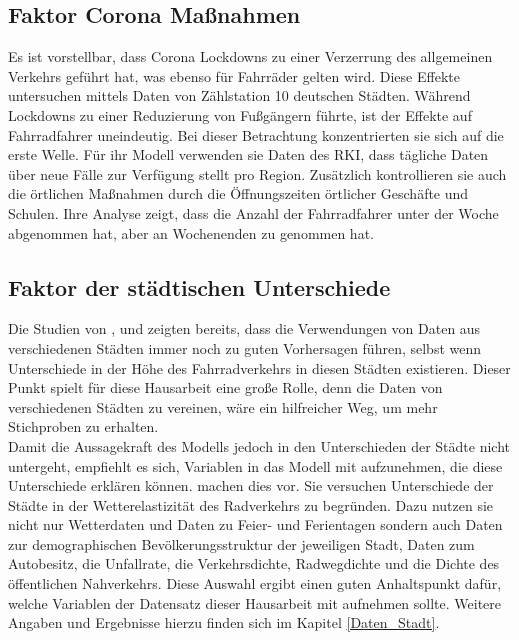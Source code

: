 \documentclass[a4paper,12pt]{thesis}
\begin{document}
\subsection{Faktor Corona Maßnahmen}

Es ist vorstellbar, dass Corona Lockdowns zu einer Verzerrung des allgemeinen Verkehrs geführt hat, was ebenso für Fahrräder gelten wird. Diese Effekte untersuchen \cite{Moellers2021} mittels Daten von Zählstation 10 deutschen Städten. Während Lockdowns zu einer Reduzierung von Fußgängern führte, ist der Effekte auf Fahrradfahrer uneindeutig. Bei dieser Betrachtung konzentrierten sie sich auf die erste Welle. Für ihr Modell verwenden sie Daten des RKI, dass tägliche Daten über neue Fälle zur Verfügung stellt pro Region. Zusätzlich kontrollieren sie auch die örtlichen Maßnahmen durch die Öffnungszeiten örtlicher Geschäfte und Schulen. Ihre Analyse zeigt, dass die Anzahl der Fahrradfahrer unter der Woche abgenommen hat, aber an Wochenenden zu genommen hat.

\subsection{Faktor der städtischen Unterschiede}\label{Faktor_Stadt}

Die Studien von \cite{Wessel2020}, \cite{Moellers2021} und \cite{Goldmann2021} zeigten bereits, dass die Verwendungen von Daten aus verschiedenen Städten immer noch zu guten Vorhersagen führen, selbst wenn Unterschiede in der Höhe des Fahrradverkehrs in diesen Städten existieren. Dieser Punkt spielt für diese Hausarbeit eine große Rolle, denn die Daten von verschiedenen Städten zu vereinen, wäre ein hilfreicher Weg, um mehr Stichproben zu erhalten.\\
Damit die Aussagekraft des Modells jedoch in den Unterschieden der Städte nicht untergeht, empfiehlt es sich, Variablen in das Modell mit aufzunehmen, die diese Unterschiede erklären können. \cite{Goldmann2021} machen dies vor. Sie versuchen Unterschiede der Städte in der Wetterelastizität des Radverkehrs zu begründen. Dazu nutzen sie nicht nur Wetterdaten und Daten zu Feier- und Ferientagen sondern auch Daten zur demographischen Bevölkerungsstruktur der jeweiligen Stadt, Daten zum Autobesitz, die Unfallrate, die Verkehrsdichte, Radwegdichte und die Dichte des öffentlichen Nahverkehrs. Diese Auswahl ergibt einen guten Anhaltspunkt dafür, welche Variablen der Datensatz dieser Hausarbeit mit aufnehmen sollte. Weitere Angaben und Ergebnisse hierzu finden sich im Kapitel \ref{Daten_Stadt}.
\end{document}
